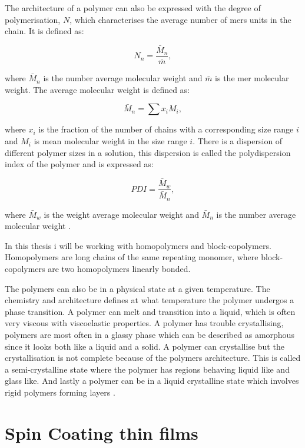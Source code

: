 \documentclass[MasterThesisMain.tex]{subfiles}
\begin{document}
The architecture of a polymer can also be expressed with the degree of polymerisation, $N$, which characterises the average number of mers units in the chain. It is defined as:

\begin{equation}
N_n = \frac{\bar{M}_n}{\bar{m}},
\end{equation}

where $\bar{M}_n$ is the number average molecular weight and $\bar{m}$ is the mer molecular weight. The average molecular weight is defined as:

\begin{equation}
\bar{M}_n = \sum x_iM_i,
\end{equation}      

where $x_i$ is the fraction of the number of chains with a corresponding size range $i$ and $M_i$ is mean molecular weight in the size range $i$. There is a dispersion of different polymer sizes in a solution, this dispersion is called the polydispersion index of the polymer and is expressed as:

\begin{equation}
PDI = \frac{\bar{M}_w}{\bar{M}_n},
\end{equation} 

where $\bar{M}_w$ is the weight average molecular weight and $\bar{M}_n$ is the number average molecular weight \cite{strobl2007physics}.

In this thesis i will be working with homopolymers and block-copolymers. Homopolymers are long chains of the same repeating monomer, where block-copolymers are two homopolymers linearly bonded.

The polymers can also be in a physical state at a given temperature. The chemistry and architecture defines at what temperature the polymer undergos a phase transition. A polymer can melt and transition into a liquid, which is often very viscous with viscoelastic properties. A polymer has trouble crystallising, polymers are most often in a glassy phase which can be described as amorphous since it looks both like a liquid and a solid. A polymer can crystallise but the crystallisation is not complete because of the polymers architecture. This is called a semi-crystalline state where the polymer has regions behaving liquid like and glass like. And lastly a polymer can be in a liquid crystalline state which involves rigid polymers forming layers \cite{petty2008molecular}. 

\section{Spin Coating thin films}
\end{document}
